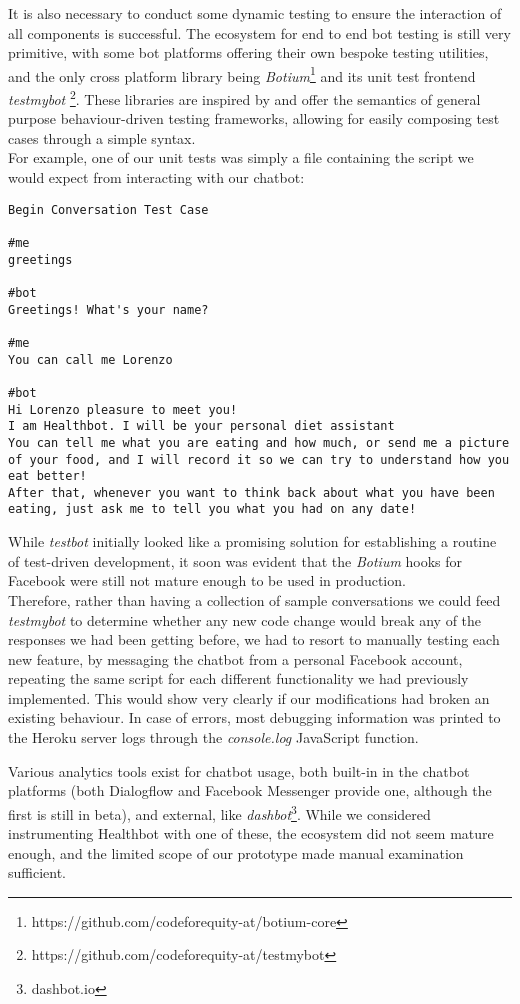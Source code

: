It is also necessary to conduct some dynamic testing to ensure the interaction of all components is successful. The ecosystem for end to end bot testing is still very primitive, with some bot platforms offering their own bespoke testing utilities, and the only cross platform library being \textit{Botium}\footnote{https://github.com/codeforequity-at/botium-core} and its unit test frontend \textit{testmybot} \footnote{https://github.com/codeforequity-at/testmybot}. These libraries are inspired by and offer the semantics of general purpose behaviour-driven testing frameworks, allowing for easily composing test cases through a simple syntax. \\
For example, one of our unit tests was simply a file containing the script we would expect from interacting with our chatbot:
\begin{lstlisting}
Begin Conversation Test Case

#me
greetings

#bot
Greetings! What's your name?

#me
You can call me Lorenzo

#bot
Hi Lorenzo pleasure to meet you!
I am Healthbot. I will be your personal diet assistant
You can tell me what you are eating and how much, or send me a picture of your food, and I will record it so we can try to understand how you eat better!
After that, whenever you want to think back about what you have been eating, just ask me to tell you what you had on any date!
\end{lstlisting}
While \textit{testbot} initially looked like a promising solution for establishing a routine of test-driven development, it soon was evident that the \textit{Botium} hooks for Facebook were still not mature enough to be used in production. \\
Therefore, rather than having a collection of sample conversations we could feed \textit{testmybot} to determine whether any new code change would break any of the responses we had been getting before, we had to resort to manually testing each new feature, by messaging the chatbot from a personal Facebook account, repeating the same script for each different functionality we had previously implemented. This would show very clearly if our modifications had broken an existing behaviour. In case of errors, most debugging information was printed to the Heroku server logs through the \textit{console.log} JavaScript function.

Various analytics tools exist for chatbot usage, both built-in in the chatbot platforms (both Dialogflow and Facebook Messenger provide one, although the first is still in beta), and external, like \textit{dashbot}\footnote{dashbot.io}. While we considered instrumenting Healthbot with one of these, the ecosystem did not seem mature enough, and the limited scope of our prototype made manual examination sufficient.

